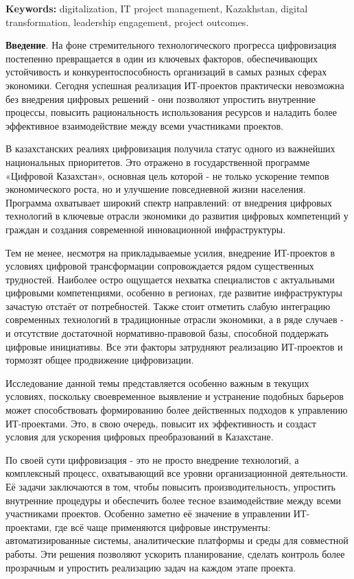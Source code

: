 {\bfseries Keywords:} digitalization, IT project management, Kazakhstan,
digital transformation, leadership enga\-gement, project outcomes.

\begin{multicols}{2}
{\bfseries Введение}. На фоне стремительного технологического прогресса
цифровизация постепенно превращается в один из ключевых факторов,
обеспечивающих устойчивость и конкурентоспособность организаций в самых
разных сферах экономики. Сегодня успешная реализация ИТ-проектов
практически невозможна без внедрения цифровых решений - они позволяют
упростить внутренние процессы, повысить рациональность использования
ресурсов и наладить более эффективное взаимодействие между всеми
участниками проектов.

В казахстанских реалиях цифровизация получила статус одного из важнейших
национальных приоритетов. Это отражено в государственной программе
«Цифровой Казахстан», основная цель которой - не только ускорение темпов
экономического роста, но и улучшение повседневной жизни населения.
Программа охватывает широкий спектр направлений: от внедрения цифровых
технологий в ключевые отрасли экономики до развития цифровых компетенций
у граждан и создания современной инновационной инфраструктуры.

Тем не менее, несмотря на прикладываемые усилия, внедрение ИТ-проектов в
условиях цифровой трансформации сопровождается рядом существенных
трудностей. Наиболее остро ощущается нехватка специалистов с актуальными
цифровыми компетенциями, особенно в регионах, где развитие
инфраструктуры зачастую отстаёт от потребностей. Также стоит отметить
слабую интеграцию современных технологий в традиционные отрасли
экономики, а в ряде случаев - и отсутствие достаточной
нормативно-правовой базы, способной поддержать цифровые инициативы. Все
эти факторы затрудняют реализацию ИТ-проектов и тормозят общее
продвижение цифровизации.

Исследование данной темы представляется особенно важным в текущих
условиях, поскольку своевременное выявление и устранение подобных
барьеров может способствовать формированию более действенных подходов к
управлению ИТ-проектами. Это, в свою очередь, повысит их эффективность и
создаст условия для ускорения цифровых преобразований в Казахстане.

По своей сути цифровизация - это не просто внедрение технологий, а
комплексный процесс, охватывающий все уровни организационной
деятельности. Её задачи заключаются в том, чтобы повысить
производительность, упростить внутренние процедуры и обеспечить более
тесное взаимодействие между всеми участниками проектов. Особенно заметно
её значение в управлении ИТ-проектами, где всё чаще применяются цифровые
инструменты: автоматизированные системы, аналитические платформы и среды
для совместной работы. Эти решения позволяют ускорить планирование,
сделать контроль более прозрачным и упростить реализацию задач на каждом
этапе проекта.


\end{multicols}
